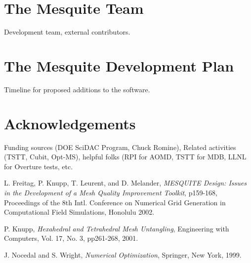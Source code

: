 \section{The Mesquite Team}
Development team, external contributors.

\section{The Mesquite Development Plan}
Timeline for proposed additions to the software.

\section{Acknowledgements}
Funding sources (DOE SciDAC Program, Chuck Romine), Related activities 
(TSTT, Cubit, Opt-MS), helpful folks (RPI for AOMD, TSTT for MDB, 
LLNL for Overture tests, etc.

\begin{thebibliography}{999}
L. Freitag, P. Knupp, T. Leurent, and D. Melander, {\it MESQUITE Design: Issues in the Development of a Mesh Quality Improvement Toolkit}, p159-168, Proceedings of the 8th Intl. Conference on Numerical Grid Generation in Computational Field Simulations, Honolulu 2002.

P. Knupp, {\it Hexahedral and Tetrahedral Mesh Untangling}, Engineering with Computers, Vol. 17, No. 3, pp261-268, 2001.

J. Nocedal and S. Wright, {\it Numerical Optimization}, Springer, New York, 1999.

\end{thebibliography}

\newpage
{} \newline
\label{append_A}
\newpage
{} \newline
\label{append_B}
\newpage
{} \newline
\label{append_C}



